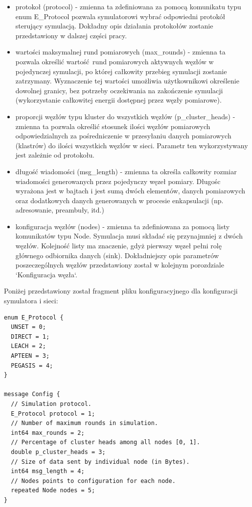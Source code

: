 \documentclass[a4paper,12pt,twoside,openany]{report}
\begin{document}
\begin{itemize}
 \item protokoł (protocol) - zmienna ta zdefiniowana za pomocą komunikatu typu enum E\_Protocol pozwala symulatorowi wybrać odpowiedni 
       protokół sterujący symulacją. Dokładny opis działania protokołów zostanie przedstawiony w dalszej części pracy.
 \item wartości maksymalnej rund pomiarowych (max\_rounds) - zmienna ta pozwala określić wartość rund pomiarowych aktywnych węzłów w pojedynczej symulacji, 
       po której całkowity przebieg symulacji zostanie zatrzymany.
       Wyznaczenie tej wartości umożliwia użytkownikowi określenie dowolnej granicy, bez potrzeby oczekiwania na zakończenie symulacji (wykorzystanie 
       całkowitej energii dostępnej przez węzły pomiarowe).
 \item proporcji węzłów typu kluster do wszystkich węzłów (p\_cluster\_heads) - zmienna ta pozwala określić stosunek ilości węzłów pomiarowych 
       odpowiedzialnych za pośredniczenie w przesyłaniu danych pomiarowych (klastrów) do ilości wszystkich węzłów w sieci. Parametr ten wykorzystywany jest
       zależnie od protokołu.
 \item długość wiadomości (msg\_length) - zmienna ta określa całkowity rozmiar wiadomości generowanych przez pojedynczy węzeł pomiary.
       Długośc wyrażona jest w bajtach i jest sumą dwóch elementów, danych pomiarowych oraz dodatkowych danych generowanych w procesie enkapsulacji
       (np. adresowanie, preambuły, itd.)
 \item konfiguracja węzłów (nodes) - zmienna ta zdefiniowana za pomocą listy komunikatów typu Node. Symulacja musi składać się przynajmniej z dwóch węzłów.
       Kolejność listy ma znaczenie, gdyż pierwszy węzeł pełni rolę głównego odbiornika danych (sink).
       Dokładniejszy opis parametrów poszeczególnych węzłów przedstawiony został w kolejnym porozdziale `Konfiguracja węzła`. 
\end{itemize}

Poniżej przedstawiony został fragment pliku konfiguracyjnego dla konfiguracji symulatora i sieci:

\begin{lstlisting}
enum E_Protocol {
  UNSET = 0;
  DIRECT = 1;
  LEACH = 2;
  APTEEN = 3;
  PEGASIS = 4;
}

message Config {
  // Simulation protocol.
  E_Protocol protocol = 1;
  // Number of maximum rounds in simulation. 
  int64 max_rounds = 2;
  // Percentage of cluster heads among all nodes [0, 1].
  double p_cluster_heads = 3;
  // Size of data sent by individual node (in Bytes).
  int64 msg_length = 4;
  // Nodes points to configuration for each node.
  repeated Node nodes = 5;
}
\end{lstlisting}
\end{document}
